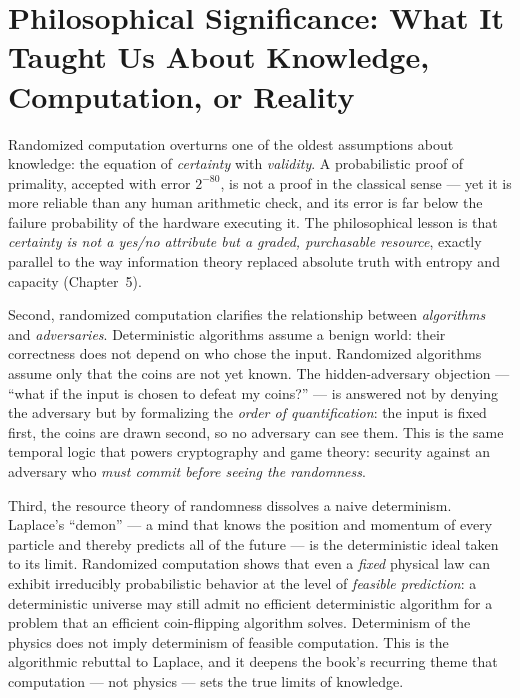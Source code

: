 \section{Philosophical Significance: What It Taught Us About Knowledge, Computation, or Reality}
\label{sec:randomized:philosophy}

Randomized computation overturns one of the oldest assumptions about knowledge: the equation of \emph{certainty} with \emph{validity}. A probabilistic proof of primality, accepted with error $2^{-80}$, is not a proof in the classical sense --- yet it is more reliable than any human arithmetic check, and its error is far below the failure probability of the hardware executing it. The philosophical lesson is that \emph{certainty is not a yes/no attribute but a graded, purchasable resource}, exactly parallel to the way information theory replaced absolute truth with entropy and capacity (Chapter~5).

Second, randomized computation clarifies the relationship between \emph{algorithms} and \emph{adversaries}. Deterministic algorithms assume a benign world: their correctness does not depend on who chose the input. Randomized algorithms assume only that the coins are not yet known. The hidden-adversary objection --- ``what if the input is chosen to defeat my coins?'' --- is answered not by denying the adversary but by formalizing the \emph{order of quantification}: the input is fixed first, the coins are drawn second, so no adversary can see them. This is the same temporal logic that powers cryptography and game theory: security against an adversary who \emph{must commit before seeing the randomness}.

Third, the resource theory of randomness dissolves a naive determinism. Laplace's ``demon'' --- a mind that knows the position and momentum of every particle and thereby predicts all of the future --- is the deterministic ideal taken to its limit. Randomized computation shows that even a \emph{fixed} physical law can exhibit irreducibly probabilistic behavior at the level of \emph{feasible prediction}: a deterministic universe may still admit no efficient deterministic algorithm for a problem that an efficient coin-flipping algorithm solves. Determinism of the physics does not imply determinism of feasible computation. This is the algorithmic rebuttal to Laplace, and it deepens the book's recurring theme that computation --- not physics --- sets the true limits of knowledge.

